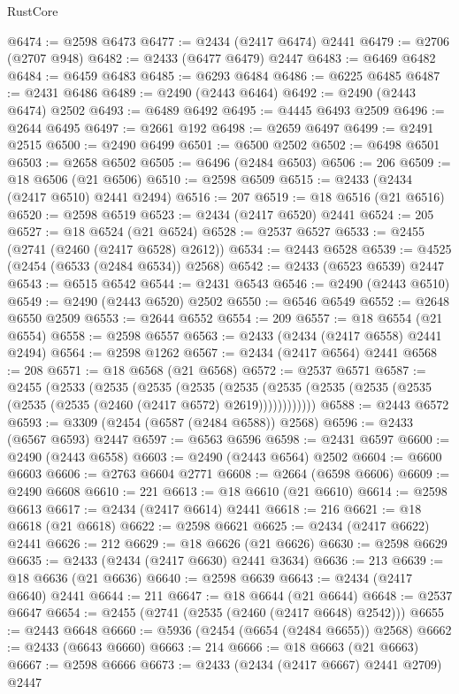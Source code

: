 \begin{lexlean}{RustCore}
\begin{coremodule}
@6474 := @2598 @6473
@6477 := @2434 (@2417 @6474) @2441
@6479 := @2706 (@2707 @948)
@6482 := @2433 (@6477 @6479) @2447
@6483 := @6469 @6482
@6484 := @6459 @6483
@6485 := @6293 @6484
@6486 := @6225 @6485
@6487 := @2431 @6486
@6489 := @2490 (@2443 @6464)
@6492 := @2490 (@2443 @6474) @2502
@6493 := @6489 @6492
@6495 := @4445 @6493 @2509
@6496 := @2644 @6495
@6497 := @2661 @192
@6498 := @2659 @6497
@6499 := @2491 @2515
@6500 := @2490 @6499
@6501 := @6500 @2502
@6502 := @6498 @6501
@6503 := @2658 @6502
@6505 := @6496 (@2484 @6503)
@6506 := 206
@6509 := @18 @6506 (@21 @6506)
@6510 := @2598 @6509
@6515 := @2433 (@2434 (@2417 @6510) @2441 @2494)
@6516 := 207
@6519 := @18 @6516 (@21 @6516)
@6520 := @2598 @6519
@6523 := @2434 (@2417 @6520) @2441
@6524 := 205
@6527 := @18 @6524 (@21 @6524)
@6528 := @2537 @6527
@6533 := @2455 (@2741 (@2460 (@2417 @6528) @2612))
@6534 := @2443 @6528
@6539 := @4525 (@2454 (@6533 (@2484 @6534)) @2568)
@6542 := @2433 (@6523 @6539) @2447
@6543 := @6515 @6542
@6544 := @2431 @6543
@6546 := @2490 (@2443 @6510)
@6549 := @2490 (@2443 @6520) @2502
@6550 := @6546 @6549
@6552 := @2648 @6550 @2509
@6553 := @2644 @6552
@6554 := 209
@6557 := @18 @6554 (@21 @6554)
@6558 := @2598 @6557
@6563 := @2433 (@2434 (@2417 @6558) @2441 @2494)
@6564 := @2598 @1262
@6567 := @2434 (@2417 @6564) @2441
@6568 := 208
@6571 := @18 @6568 (@21 @6568)
@6572 := @2537 @6571
@6587 := @2455
    (@2533
      (@2535
        (@2535
          (@2535
            (@2535 (@2535 (@2535 (@2535 (@2535 (@2535 (@2535 (@2460 (@2417 @6572) @2619))))))))))))
@6588 := @2443 @6572
@6593 := @3309 (@2454 (@6587 (@2484 @6588)) @2568)
@6596 := @2433 (@6567 @6593) @2447
@6597 := @6563 @6596
@6598 := @2431 @6597
@6600 := @2490 (@2443 @6558)
@6603 := @2490 (@2443 @6564) @2502
@6604 := @6600 @6603
@6606 := @2763 @6604 @2771
@6608 := @2664 (@6598 @6606)
@6609 := @2490 @6608
@6610 := 221
@6613 := @18 @6610 (@21 @6610)
@6614 := @2598 @6613
@6617 := @2434 (@2417 @6614) @2441
@6618 := 216
@6621 := @18 @6618 (@21 @6618)
@6622 := @2598 @6621
@6625 := @2434 (@2417 @6622) @2441
@6626 := 212
@6629 := @18 @6626 (@21 @6626)
@6630 := @2598 @6629
@6635 := @2433 (@2434 (@2417 @6630) @2441 @3634)
@6636 := 213
@6639 := @18 @6636 (@21 @6636)
@6640 := @2598 @6639
@6643 := @2434 (@2417 @6640) @2441
@6644 := 211
@6647 := @18 @6644 (@21 @6644)
@6648 := @2537 @6647
@6654 := @2455 (@2741 (@2535 (@2460 (@2417 @6648) @2542)))
@6655 := @2443 @6648
@6660 := @5936 (@2454 (@6654 (@2484 @6655)) @2568)
@6662 := @2433 (@6643 @6660)
@6663 := 214
@6666 := @18 @6663 (@21 @6663)
@6667 := @2598 @6666
@6673 := @2433 (@2434 (@2417 @6667) @2441 @2709) @2447

\end{coremodule}
\end{lexlean}
